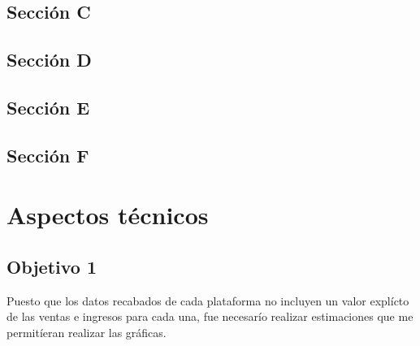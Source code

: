 \documentclass[letterpaper, 11pt]{article}
\begin{document}
    \subsection{Sección C} %
    

    \subsection{Sección D}

    \subsection{Sección E}

    \subsection{Sección F}


\newpage
\pagestyle{technic}
\section{Aspectos técnicos}
\subsection{Objetivo 1}
    Puesto que los datos recabados de cada plataforma no incluyen un valor explícto de las ventas e ingresos para cada una, fue necesarío realizar estimaciones que me permitíeran realizar las gráficas. 
\end{document}
